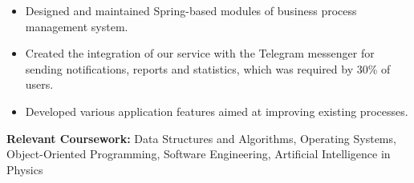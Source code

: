 \documentclass[12pt,a4paper,ragged2e,withhyper]{altacv}
\begin{document}
\divider
\smallskip

\begin{itemize}
    \item Designed and maintained Spring-based modules of business process management system.
    \item Created the integration of our service with the Telegram messenger for sending notifications, reports and statistics, which was required by 30\% of users.
    \item Developed various application features aimed at improving existing processes.
\end{itemize}

\medskip



\textbf{Relevant Coursework:} Data Structures and Algorithms, Operating Systems, Object-Oriented Programming, Software Engineering, Artificial Intelligence in Physics
\end{document}
